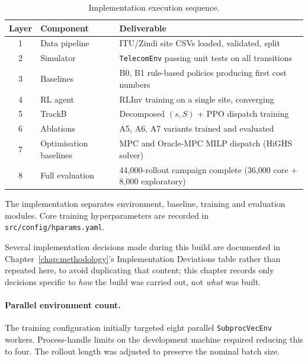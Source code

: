 \begin{table}[htb]
\centering
\small
\caption{Implementation execution sequence.}
\label{tab:impl_sequence}
\begin{tabular}{cp{2.6cm}p{8.2cm}}
\toprule
\textbf{Layer} & \textbf{Component} & \textbf{Deliverable} \\
\midrule
1 & Data pipeline   & ITU/Zindi site CSVs loaded, validated, split \\
2 & Simulator       & \texttt{TelecomEnv} passing unit tests on all transitions \\
3 & Baselines       & B0, B1 rule-based policies producing first cost numbers \\
4 & RL agent        & RLInv training on a single site, converging \\
5 & TrackB          & Decomposed $(s,S)$ + PPO dispatch training \\
6 & Ablations       & A5, A6, A7 variants trained and evaluated \\
7 & Optimisation baselines & MPC and Oracle-MPC MILP dispatch (HiGHS solver) \\
8 & Full evaluation & 44{,}000-rollout campaign complete (36{,}000 core $+$
                        8{,}000 exploratory) \\
\bottomrule
\end{tabular}
\end{table}


The implementation separates environment,
baseline, training and evaluation modules.
Core training hyperparameters are recorded in
\texttt{src/config/hparams.yaml}.

Several implementation decisions made during this build are documented
in Chapter~\ref{chap:methodology}'s Implementation Deviations table
rather than repeated here, to avoid duplicating that content; this
chapter records only decisions specific to \emph{how} the build was
carried out, not \emph{what} was built.

\begin{sloppypar}
\paragraph{Parallel environment count.}
The training configuration initially targeted eight
parallel \texttt{SubprocVecEnv} workers. Process-handle
limits on the development machine required reducing
this to four. The rollout length was adjusted to
preserve the nominal batch size.
\end{sloppypar}

